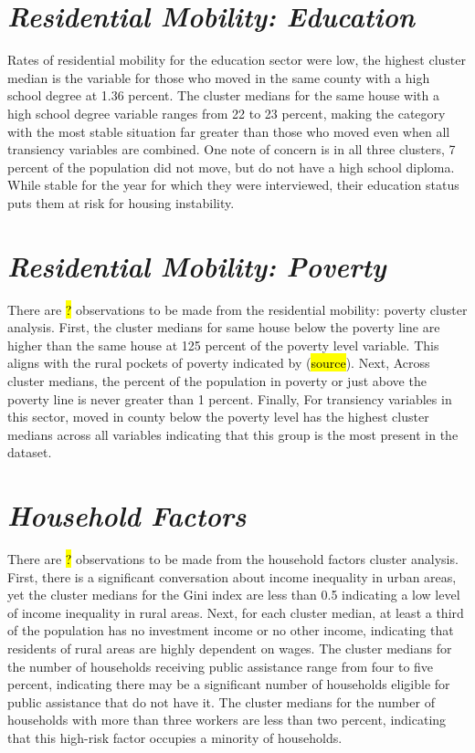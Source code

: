 \section{\textit{Residential Mobility: Education}}
Rates of residential mobility for the education sector were low, the highest cluster median is the variable for those who moved in the same county with a high school degree at 1.36 percent. The cluster medians for the same house with a high school degree variable ranges from 22 to 23 percent, making the category with the most stable situation far greater than those who moved even when all transiency variables are combined. One note of concern is in all three clusters, 7 percent of the population did not move, but do not have a high school diploma. While stable for the year for which they were interviewed, their education status puts them at risk for housing instability. 

\section{\textit{Residential Mobility: Poverty}}
There are \hl{?} observations to be made from the residential mobility: poverty cluster analysis. First, the cluster medians for same house below the poverty line are higher than the same house at 125 percent of the poverty level variable. This aligns with the rural pockets of poverty indicated by (\hl{source}). Next, Across cluster medians, the percent of the population in poverty or just above the poverty line is never greater than 1 percent. Finally, For transiency variables in this sector, moved in county below the poverty level has the highest cluster medians across all variables indicating that this group is the most present in the dataset. 

\section{\textit{Household Factors}}
There are \hl{?} observations to be made from the household factors cluster analysis. First, there is a significant conversation about income inequality in urban areas, yet the cluster medians for the Gini index are less than 0.5 indicating a low level of income inequality in rural areas. Next,  for each cluster median, at least a third of the population has no investment income or no other income, indicating that residents of rural areas are highly dependent on wages. The cluster medians for the number of households receiving public assistance range from four to five percent, indicating there may be a significant number of households eligible for public assistance that do not have it. The cluster medians for the number of households with more than three workers are less than two percent, indicating that this high-risk factor occupies a minority of households. 


